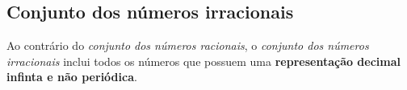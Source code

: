 \subsection{Conjunto dos números irracionais}

Ao contrário do \emph{conjunto dos números racionais}, o \emph{conjunto dos números irracionais} inclui todos os números que possuem uma \textbf{representação decimal infinta e não periódica}.